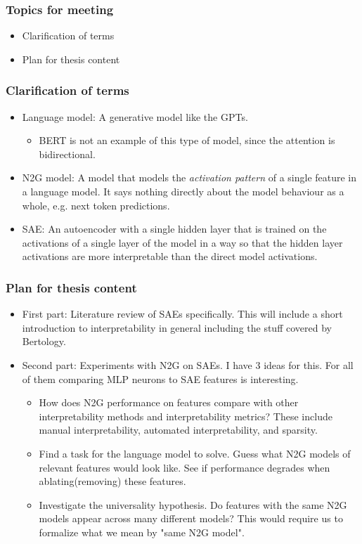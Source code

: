 \documentclass[aspectratio=169]{beamer}
\begin{document}
\begin{frame}[fragile=singleslide]
    \frametitle{Topics for meeting}
    \begin{itemize}
        \item Clarification of terms
        \item Plan for thesis content
    \end{itemize}
\end{frame}
\begin{frame}[fragile=singleslide]
    \frametitle{Clarification of terms}
    \begin{itemize}
        \item Language model: A generative model like the GPTs. 
        \begin{itemize}
            \item BERT is not an example of this type of model, since the attention is bidirectional.
        \end{itemize}
        \item N2G model: A model that models the \emph{activation pattern} of a single feature in a language model.
        It says nothing directly about the model behaviour as a whole, e.g. next token predictions.
        \item SAE: An autoencoder with a single hidden layer that is trained on the activations of a single layer of the model 
        in a way so that the hidden layer activations are more interpretable than the direct model activations.
    \end{itemize}
\end{frame}
\begin{frame}[fragile=singleslide]
    \frametitle{Plan for thesis content}
    \begin{itemize}
        \item First part: Literature review of SAEs specifically.
        This will include a short introduction to interpretability in general including the stuff covered by Bertology.
        \item Second part: Experiments with N2G on SAEs.
        I have 3 ideas for this. 
        For all of them comparing MLP neurons to SAE features is interesting.
        \begin{itemize}
            \item How does N2G performance on features compare with other interpretability methods and interpretability metrics?
            These include manual interpretability, automated interpretability, and sparsity.
            \item Find a task for the language model to solve. 
            Guess what N2G models of relevant features would look like.
            See if performance degrades when ablating(removing) these features.
            \item Investigate the universality hypothesis.
            Do features with the same N2G models appear across many different models?
            This would require us to formalize what we mean by "same N2G model".
        \end{itemize}
    \end{itemize}
\end{frame}
\end{document}

